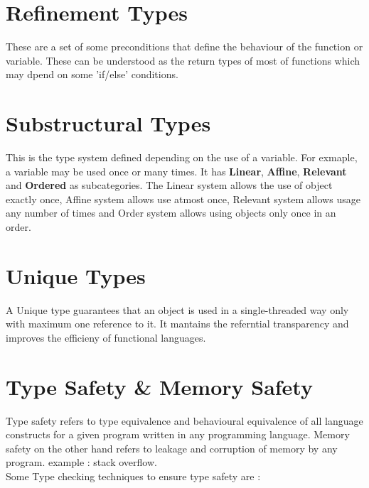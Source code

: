 \section{Refinement Types}
These are a set of some preconditions that define the behaviour of the function or variable. These can be understood as the return types of most of functions which may dpend on some 'if/else' conditions.

\section{Substructural Types}
This is the type system defined depending on the use of a variable. For exmaple, a variable may be used once or many times. It has \textbf{Linear}, \textbf{Affine}, \textbf{Relevant} and \textbf{Ordered} as subcategories. The Linear system allows the use of object exactly once, Affine system allows use atmost once, Relevant system allows usage any number of times and Order system allows using objects only once in an order.

\section{Unique Types}
A Unique type guarantees that an object is used in a single-threaded way only with maximum one reference to it. It mantains the referntial transparency and improves the efficieny of functional languages.


\section{Type Safety \& Memory Safety }
Type safety refers to type equivalence and behavioural equivalence of all language constructs for a given program written in any programming language. Memory safety on the other hand refers to leakage and corruption of memory by any program. example : stack overflow.\\

Some Type checking techniques to ensure type safety are :

